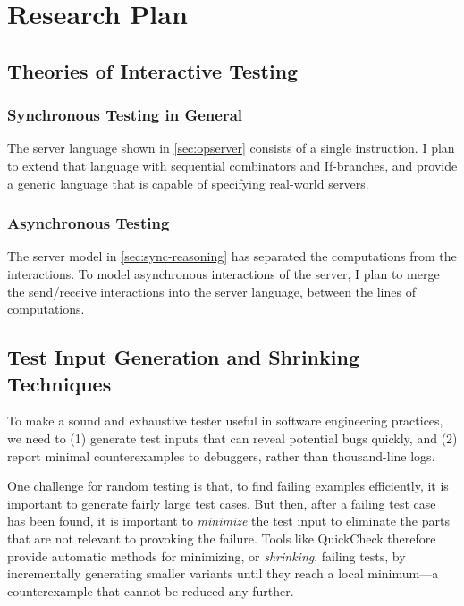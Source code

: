 \documentclass{article}
\theoremstyle{definition}
\begin{document}
\section{Research Plan}

\subsection{Theories of Interactive Testing}

\subsubsection{Synchronous Testing in General}
The server language shown in \autoref{sec:opserver} consists of a single
instruction.  I plan to extend that language with sequential combinators and
If-branches, and provide a generic language that is capable of specifying
real-world servers.
\subsubsection{Asynchronous Testing}
The server model in \autoref{sec:sync-reasoning} has separated the computations
from the interactions.  To model asynchronous interactions of the server, I plan
to merge the send/receive interactions into the server language, between the
lines of computations.

\subsection{Test Input Generation and Shrinking Techniques}
\label{sec:harness}
To make a sound and exhaustive tester useful in software engineering practices,
we need to (1) generate test inputs that can reveal potential bugs quickly, and
(2) report minimal counterexamples to debuggers, rather than thousand-line logs.

One challenge for random testing is that, to find failing examples efficiently,
it is important to generate fairly large test cases.  But then, after a failing
test case has been found, it is important to \textit{minimize} the test input to
eliminate the parts that are not relevant to provoking the failure.  Tools like
QuickCheck therefore provide automatic methods for minimizing, or {\em
  shrinking}, failing tests, by incrementally generating smaller variants until
they reach a local minimum---a counterexample that cannot be reduced any
further.
\end{document}
